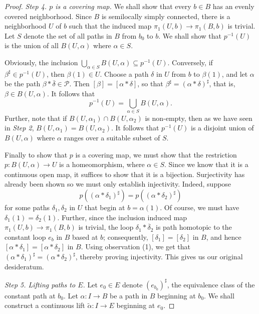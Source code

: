 \documentclass[10pt]{article}
\theoremstyle{thmstyle}
\theoremstyle{defstyle}
\newcommand{\scrP}{\mathscr{P}}
\newcommand{\wt}[1]{\widetilde{#1}}
\begin{document}
\begin{proof}
\noindent\emph{Step 4. $p$ is a covering map.} We shall show that every $b\in B$ has an evenly covered neighborhood. Since $B$ is semilocally simply connected, there is a neighborhood $U$ of $b$ such that the induced map $\pi_1(U, b)\to\pi_1(B,b)$ is trivial. Let $S$ denote the set of all paths in $B$ from $b_0$ to $b$. We shall show that $p^{-1}(U)$ is the union of all $B(U,\alpha)$ where $\alpha\in S$.

Obviously, the inclusion $\displaystyle\bigcup_{\alpha\in S} B(U,\alpha)\subseteq p^{-1}(U)$. Conversely, if $\beta^\sharp\in p^{-1}(U)$, then $\beta(1)\in U$. Choose a path $\delta$ in $U$ from $b$ to $\beta(1)$, and let $\alpha$ be the path $\beta\ast\overline\delta\in\scrP$. Then $[\beta] = [\alpha\ast\delta]$, so that $\beta^\sharp = (\alpha\ast\delta)^\sharp$, that is, $\beta\in B(U,\alpha)$. It follows that 
\begin{equation*}
    p^{-1}(U) = \bigcup_{\alpha\in S} B(U,\alpha).
\end{equation*}
Further, note that if $B(U,\alpha_1)\cap B(U,\alpha_2)$ is non-empty, then as we have seen in \emph{Step 2}, $B(U, \alpha_1) = B(U, \alpha_2)$. It follows that $p^{-1}(U)$ is a disjoint union of $B(U, \alpha)$ where $\alpha$ ranges over a suitable subset of $S$.

Finally to show that $p$ is a covering map, we must show that the restriction $p: B(U, \alpha)\to U$ is a homeomorphism, where $\alpha\in S$. Since we know that it is a continuous open map, it suffices to show that it is a bijection. Surjectivity has already been shown so we must only establish injectivity. Indeed, suppose 
\begin{equation*}
    p\left((\alpha\ast\delta_1)^\sharp\right) = p\left((\alpha\ast\delta_2)^\sharp\right)
\end{equation*}
for some paths $\delta_1,\delta_2$ in $U$ that begin at $b = \alpha(1)$. Of course, we must have $\delta_1(1) = \delta_2(1)$. Further, since the inclusion induced map $\pi_1(U, b)\to \pi_1(B, b)$ is trivial, the loop $\delta_1\ast\overline\delta_2$ is path homotopic to the constant loop $e_b$ in $B$ based at $b$; consequently, $[\delta_1] = [\delta_2]$ in $B$, and hence $[\alpha\ast\delta_1] = [\alpha\ast\delta_2]$ in $B$. Using observation (1), we get that $(\alpha\ast\delta_1)^\sharp = (\alpha\ast\delta_2)^\sharp$, thereby proving injectivity. This gives us our original desideratum.

\emph{Step 5. Lifting paths to $E$.} Let $e_0\in E$ denote $(e_{b_0})^\sharp$, the equivalence class of the constant path at $b_0$. Let $\alpha: I\to B$ be a path in $B$ beginning at $b_0$. We shall construct a continuous lift $\wt\alpha: I\to E$ beginning at $e_0$. 


\end{proof}
\end{document}
